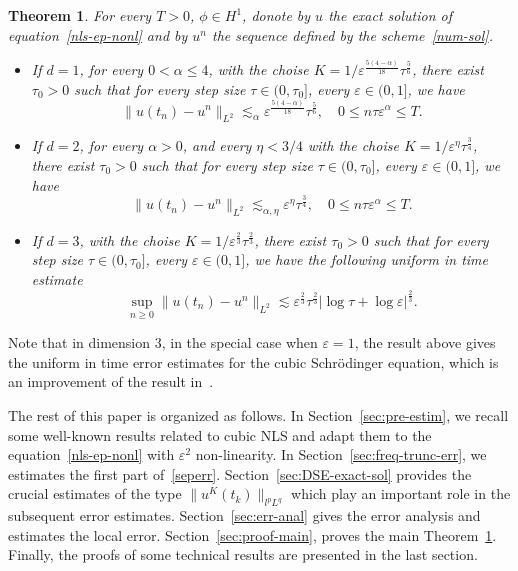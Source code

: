 \documentclass[10pt,a4paper]{article}
\newtheorem{theorem}{Theorem}[section]
\begin{document}
  \begin{theorem}\label{main}
    For every \( T > 0 \), \( \phi \in H^1 \), donote by \(u\) the exact solution
    of equation~\eqref{nls-ep-nonl} and by \(u^n\) the sequence defined by the 
    scheme~\eqref{num-sol}.
    \begin{itemize}
      \item If \(d=1\), for every \(0 < \alpha \leq 4\), with the choise 
        \(K=1/\varepsilon^\frac{5(4-\alpha)}{18}\tau^\frac56\), there exist \(\tau_0 > 0\) 
        such that for every step size \(\tau \in (0,\tau_0]\), every 
        \( \varepsilon \in (0,1] \), we have 
        \[ \|u(t_n)-u^n\|_{L^2} \lesssim_\alpha \varepsilon^\frac{5(4-\alpha)}{18}\tau^\frac56, \quad 
        0 \leq n\tau\varepsilon^\alpha \leq T. \]
      \item If \(d=2\), for every \(\alpha > 0\), and every \(\eta < 3/4\) with 
        the choise \(K=1/\varepsilon^\eta\tau^\frac34\), there exist \(\tau_0 > 0\) 
        such that for every step size \(\tau \in (0,\tau_0]\), every 
        \( \varepsilon \in (0,1] \), we have
        \[ \|u(t_n)-u^n\|_{L^2} \lesssim_{\alpha,\eta} \varepsilon^\eta \tau^\frac34, \quad 
        0 \leq n\tau\varepsilon^\alpha \leq T. \]
      \item If \(d=3\), with the choise \(K=1/\varepsilon^\frac23\tau^\frac23\), 
        there exist \(\tau_0 > 0\) 
        such that for every step size \(\tau \in (0,\tau_0]\), every 
        \( \varepsilon \in (0,1] \), 
        we have the following uniform in time estimate
        \[ \sup_{n \geq 0} \|u(t_n)-u^n\|_{L^2} \lesssim \varepsilon^\frac23 
        \tau^\frac23|\log\tau+\log\varepsilon|^\frac23. \]
    \end{itemize}
  \end{theorem}

  Note that in dimension \(3\), in the special case when \(\varepsilon=1\), the
  result above gives the uniform in time error estimates for the cubic
  Schr\"odinger equation, which is an improvement of the result in~\cite{ORS21}.

  The rest of this paper is organized as follows. In
  Section~\ref{sec:pre-estim}, we recall some well-known results related to
  cubic NLS and adapt them to the equation~\eqref{nls-ep-nonl} with
  \(\varepsilon^2\) non-linearity. In Section~\ref{sec:freq-trunc-err}, we estimates 
  the first part of~\eqref{seperr}. Section~\ref{sec:DSE-exact-sol}
  provides the crucial estimates of the type \(\|u^K(t_k)\|_{l^p L^q}\) which play an
  important role in the subsequent error estimates. Section~\ref{sec:err-anal}
  gives the error analysis and estimates the local error. Section~\ref{sec:proof-main},
  proves the main Theorem~\ref{main}. Finally, the proofs of  some technical 
  results are presented in the last section.
\end{document}

